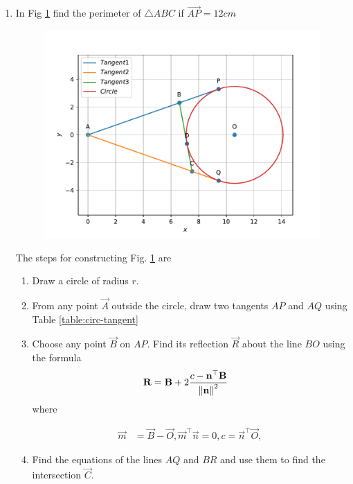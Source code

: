 \documentclass[journal,12pt,twocolumn]{IEEEtran}
\begin{document}
\begin{enumerate}
\begin{table}[ht!]
\end{table}
     \item In Fig 
	  \ref{fig:matrix-10-15.pdf}
find the perimeter of $\triangle ABC$ if $\vec{AP} = 12cm$\\
  \begin{figure}
	  \centering 
	  \includegraphics[width=\columnwidth]{figs/matrix-10-15.pdf}
	  \caption{}
	  \label{fig:matrix-10-15.pdf}
	  \end{figure}
     \solution The steps for constructing Fig.
	  \ref{fig:matrix-10-15.pdf}
	  are
	  \begin{enumerate}
		  \item Draw a circle of radius $r$.
		  \item From any point $\vec{A}$ outside the circle, draw two tangents $AP$ and $AQ$
	using Table \ref{table:circ-tangent}
\item Choose any point $\vec{B}$ on $AP$.   Find its reflection $\vec{R}$ about the line $BO$ using the formula
		\begin{align}
			\mathbf{R} &=
	  \mathbf{B} + 2\frac{c - \mathbf{n}^{\top}\mathbf{B}}{\left\lVert\mathbf{n}\right\rVert^2}
			\label{eq:image_pt_plane}
		\end{align}
		where 

		\begin{align}
			\vec{m} &= 
			\vec{B}- 
			\vec{O},
			\vec{m}^{\top}\vec{n}  = 0,
			c = 
			\vec{n}^{\top}\vec{O},
		\end{align}
	\item Find the equations of the lines $AQ$ and $BR$ and use them to find the intersection $\vec{C}$.
	

\end{enumerate}
\end{enumerate}
\end{document}
